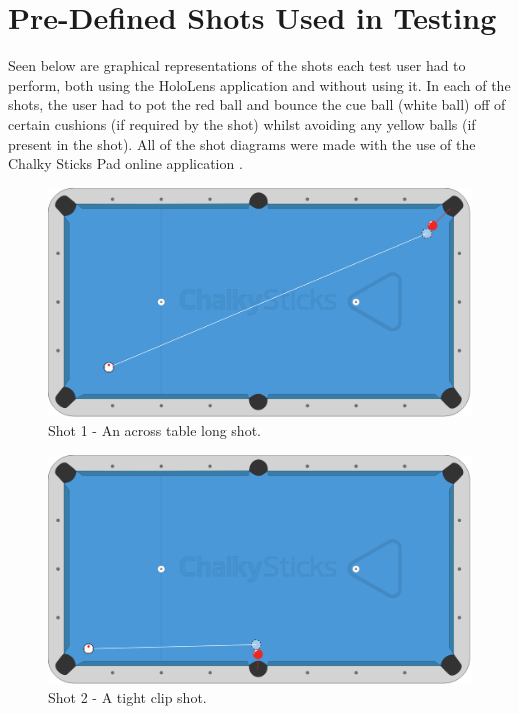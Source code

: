 \documentclass[ %
                author={Finn Alexander Wilkinson},
                supervisor={Dr. Andrew Calway},
                degree={MEng},
                title={\centering A Mixed Reality Aim Assistant for Pool and Snooker},
                subtitle={},
                type={Enterprise},
                year={2021} ]{dissertation}
\begin{document}

\chapter{Pre-Defined Shots Used in Testing}
\label{appx:shotDiagrams}
Seen below are graphical representations of the shots each test user had to perform, both using the HoloLens application and without using it. In each of the shots, the user had to pot the red ball and bounce the cue ball (white ball) off of certain cushions (if required by the shot) whilst avoiding any yellow balls (if present in the shot). 
\newline
\newline
All of the shot diagrams were made with the use of the Chalky Sticks Pad online application \cite{chalkySticks}.
\newline
\begin{figure}[h]
    \centering
    \includegraphics[scale = 0.2]{Images/Shot Diagrams/Shot_1.png}
    \caption{Shot 1 - An across table long shot.}
    \label{fig:shot1}
\end{figure}

\begin{figure}[h]
    \centering
    \includegraphics[scale = 0.2]{Images/Shot Diagrams/Shot_2.png}
    \caption{Shot 2 - A tight clip shot.}
    \label{fig:shot2}
\end{figure}
\end{document}
